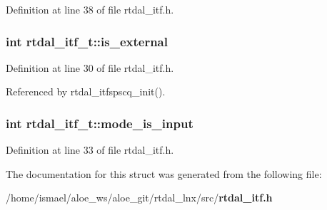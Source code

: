 Definition at line 38 of file rtdal\-\_\-itf.\-h.

\subsubsection[{is\-\_\-external}]{\setlength{\rightskip}{0pt plus 5cm}int rtdal\-\_\-itf\-\_\-t\-::is\-\_\-external}\label{structrtdal__itf__t_a7aa5980c8e478bc1ea1496a0be71091e}


Definition at line 30 of file rtdal\-\_\-itf.\-h.



Referenced by rtdal\-\_\-itfspscq\-\_\-init().

\subsubsection[{mode\-\_\-is\-\_\-input}]{\setlength{\rightskip}{0pt plus 5cm}int rtdal\-\_\-itf\-\_\-t\-::mode\-\_\-is\-\_\-input}\label{structrtdal__itf__t_afda665341072e66ef18a5b90e39f816b}


Definition at line 33 of file rtdal\-\_\-itf.\-h.



The documentation for this struct was generated from the following file\-:\begin{DoxyCompactItemize}
\item 
/home/ismael/aloe\-\_\-ws/aloe\-\_\-git/rtdal\-\_\-lnx/src/{\bf rtdal\-\_\-itf.\-h}\end{DoxyCompactItemize}
